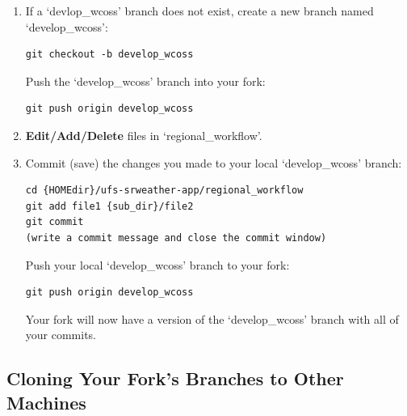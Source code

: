 \documentclass[11pt,fleqn]{report}              %
\begin{document}
\begin{enumerate}
\item If a `devlop\_wcoss' branch does not exist, create a new branch named `develop\_wcoss':
\lstset{language=bash}   
\begin{lstlisting}[frame=trBL]
git checkout -b develop_wcoss
\end{lstlisting}

Push the `develop\_wcoss' branch into your fork:
\lstset{language=bash}   
\begin{lstlisting}[frame=trBL]
git push origin develop_wcoss
\end{lstlisting}

\item {\bf Edit/Add/Delete} files in `regional\_workflow'. 

\vspace{0.2cm}

\item Commit (save) the changes you made to your local `develop\_wcoss' branch:

\lstset{language=bash}   
\begin{lstlisting}[frame=trBL]
cd {HOMEdir}/ufs-srweather-app/regional_workflow
git add file1 {sub_dir}/file2
git commit
(write a commit message and close the commit window)
\end{lstlisting}

Push your local `develop\_wcoss' branch to your fork:
\lstset{language=bash}   
\begin{lstlisting}[frame=trBL]
git push origin develop_wcoss
\end{lstlisting}
Your fork will now have a version of the `develop\_wcoss' branch with all of your commits. 

\end{enumerate}




\subsection{Cloning Your Fork's Branches to Other Machines}
\label{subsec:clone_srw_github_other}
\end{document}
